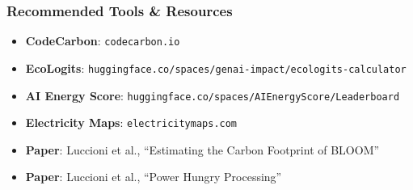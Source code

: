 \subsubsection*{Recommended Tools \& Resources}
\begin{itemize}
  \item \textbf{CodeCarbon}: \texttt{codecarbon.io}
  \item \textbf{EcoLogits}: \texttt{huggingface.co/spaces/genai-impact/ecologits-calculator}
  \item \textbf{AI Energy Score}: \texttt{huggingface.co/spaces/AIEnergyScore/Leaderboard}
  \item \textbf{Electricity Maps}: \texttt{electricitymaps.com}
  \item \textbf{Paper}: Luccioni et al., ``Estimating the Carbon Footprint of BLOOM''
  \item \textbf{Paper}: Luccioni et al., ``Power Hungry Processing''
\end{itemize}


